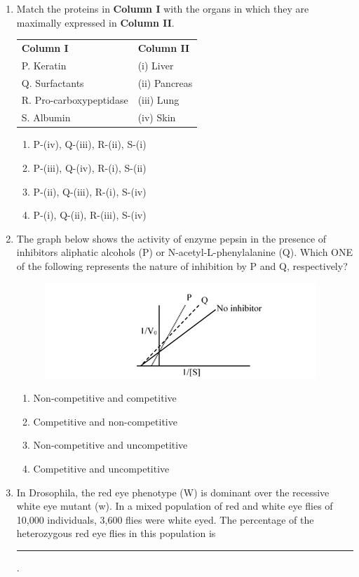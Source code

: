\documentclass[journal,12pt,onecolumn]{IEEEtran}
\begin{document}
\begin{enumerate}[label=\arabic*.,resume]
\item Match the proteins in \textbf{Column I} with the organs in which they are maximally expressed in \textbf{Column II}.

\begin{table}[H]
\centering
\begin{tabular}{ll}
\textbf{Column I} & \textbf{Column II} \\
P. Keratin & (i) Liver \\
Q. Surfactants & (ii) Pancreas \\
R. Pro-carboxypeptidase & (iii) Lung \\
S. Albumin & (iv) Skin \\
\end{tabular}
\end{table}

\begin{multicols}{2}
\begin{enumerate}[label=(\Alph*)]
\item P-(iv), Q-(iii), R-(ii), S-(i)
\item P-(iii), Q-(iv), R-(i), S-(ii)
\item P-(ii), Q-(iii), R-(i), S-(iv)
\item P-(i), Q-(ii), R-(iii), S-(iv)
\end{enumerate}
\end{multicols}

\item The graph below shows the activity of enzyme pepsin in the presence of inhibitors aliphatic alcohols (P) or N-acetyl-L-phenylalanine (Q). Which ONE of the following represents the nature of inhibition by P and Q, respectively?

\begin{figure}[H]
\centering
\includegraphics[width=0.7\columnwidth]{FIG/T-19.png}
\caption*{}
\label{T-19}
\end{figure}

\begin{enumerate}[label=(\Alph*)]
\item Non-competitive and competitive
\item Competitive and non-competitive
\item Non-competitive and uncompetitive
\item Competitive and uncompetitive
\end{enumerate}

\item In Drosophila, the red eye phenotype (W) is dominant over the recessive white eye mutant (w). In a mixed population of red and white eye flies of 10,000 individuals, 3,600 flies were white eyed. The percentage of the heterozygous red eye flies in this population is \rule{2.5cm}{0.1pt}.

\end{enumerate}
\newpage
\end{document}
